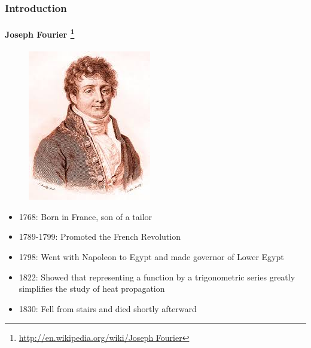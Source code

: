 \documentclass[hyperref={pdfpagelabels=true}]{beamer}
\begin{document}
\begin{frame}
\frametitle{Introduction}
\framesubtitle{Joseph Fourier \tiny{\footnote {\url{http://en.wikipedia.org/wiki/Joseph Fourier}}}}
\begin{figure}[!tbp]
\centering
\includegraphics[scale = 0.35]{figs/cvb.jpg}
\end{figure}
\small{
\begin{itemize}
\item 1768: Born in France, son of a tailor
\item 1789-1799: Promoted the French Revolution
\item 1798: Went with Napoleon to Egypt and made
governor of Lower Egypt
\item 1822: Showed that representing a function by a
trigonometric series greatly simplifies the study of
heat propagation
\item1830: Fell from stairs and died shortly afterward
\end{itemize}}
\end{frame}
\end{document}
